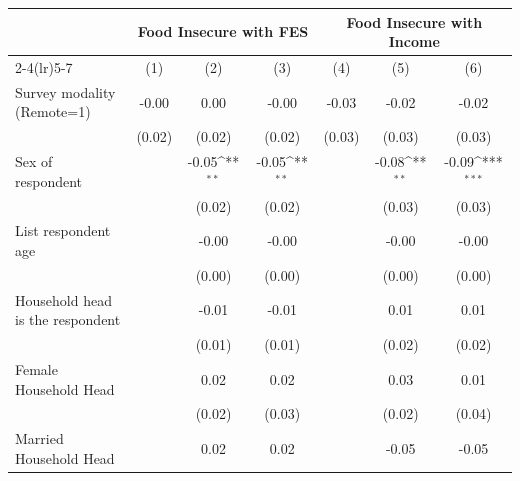 {
\def\sym#1{\ifmmode^{#1}\else\(^{#1}\)\fi}
\begin{tabular}{l*{6}{c}}
\hline\hline
                    &\multicolumn{3}{c}{Food Insecure with FES}                       &\multicolumn{3}{c}{Food Insecure with Income}                    \\\cmidrule(lr){2-4}\cmidrule(lr){5-7}
                    &\multicolumn{1}{c}{(1)}         &\multicolumn{1}{c}{(2)}         &\multicolumn{1}{c}{(3)}         &\multicolumn{1}{c}{(4)}         &\multicolumn{1}{c}{(5)}         &\multicolumn{1}{c}{(6)}         \\
\hline
Survey modality (Remote=1)&       -0.00         &        0.00         &       -0.00         &       -0.03         &       -0.02         &       -0.02         \\
                    &      (0.02)         &      (0.02)         &      (0.02)         &      (0.03)         &      (0.03)         &      (0.03)         \\
Sex of respondent   &                     &       -0.05\sym{**} &       -0.05\sym{**} &                     &       -0.08\sym{**} &       -0.09\sym{***}\\
                    &                     &      (0.02)         &      (0.02)         &                     &      (0.03)         &      (0.03)         \\
List respondent age &                     &       -0.00         &       -0.00         &                     &       -0.00         &       -0.00         \\
                    &                     &      (0.00)         &      (0.00)         &                     &      (0.00)         &      (0.00)         \\
Household head is the respondent&                     &       -0.01         &       -0.01         &                     &        0.01         &        0.01         \\
                    &                     &      (0.01)         &      (0.01)         &                     &      (0.02)         &      (0.02)         \\
Female Household Head&                     &        0.02         &        0.02         &                     &        0.03         &        0.01         \\
                    &                     &      (0.02)         &      (0.03)         &                     &      (0.02)         &      (0.04)         \\
Married Household Head&                     &        0.02         &        0.02         &                     &       -0.05         &       -0.05         \\

\end{tabular}}

